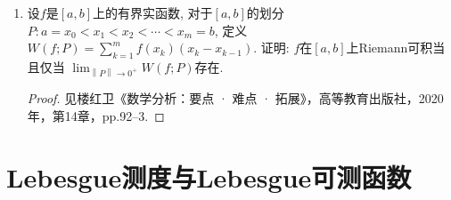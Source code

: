 \begin{quizb}
\begin{enumerate}
\item 设\(f\)是\([a,b]\)上的有界实函数, 对于\([a,b]\)的划分\(P:a=x_0<x_1<x_2<\cdots<x_m=b\), 
定义\(W(f;P)=\sum_{k=1}^{m}f(x_k)(x_{k}-x_{k-1})\). 
证明: \(f\)在\([a,b]\)上Riemann可积当且仅当
\(\lim_{\left\|P\right\|\rightarrow 0^+ }W(f;P)\)存在.
\begin{proof}
	见楼红卫《数学分析：要点 · 难点 · 拓展》，高等教育出版社，2020年，第14章，pp.92--3.
\end{proof}
\end{enumerate}
\end{quizb}

\section{Lebesgue测度与Lebesgue可测函数}
